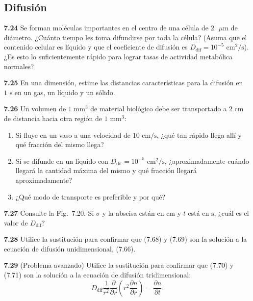 \documentclass[12pt]{book}
\begin{document}
\subsection*{Difusión}

\textbf{7.24} Se forman moléculas importantes en el centro de una célula de $2\text{ }\mu\text{m}$ de diámetro. ¿Cuánto tiempo les toma difundirse por toda la célula? (Asuma que el contenido celular es líquido y que el coeficiente de difusión es $D_{\text{dif}} = 10^{-5}\text{ cm}^2\text{/s}$). ¿Es esto lo suficientemente rápido para lograr tasas de actividad metabólica normales?

\textbf{7.25} En una dimensión, estime las distancias características para la difusión en $1\text{ s}$ en un gas, un líquido y un sólido.

\textbf{7.26} Un volumen de $1\text{ mm}^3$ de material biológico debe ser transportado a $2\text{ cm}$ de distancia hacia otra región de $1\text{ mm}^3$:
\begin{enumerate}
  \item[(a)] Si fluye en un vaso a una velocidad de $10\text{ cm/s}$, ¿qué tan rápido llega allí y qué fracción del mismo llega?
  \item[(b)] Si se difunde en un líquido con $D_{\text{dif}} = 10^{-5}\text{ cm}^2\text{/s}$, ¿aproximadamente cuándo llegará la cantidad máxima del mismo y qué fracción llegará aproximadamente?
  \item[(c)] ¿Qué modo de transporte es preferible y por qué?
\end{enumerate}

\textbf{7.27} Consulte la Fig.~7.20. Si $\sigma$ y la abscisa están en $\text{cm}$ y $t$ está en $\text{s}$, ¿cuál es el valor de $D_{\text{dif}}$?

\textbf{7.28} Utilice la sustitución para confirmar que (7.68) y (7.69) son la solución a la ecuación de difusión unidimensional, (7.66).

\textbf{7.29} (Problema avanzado) Utilice la sustitución para confirmar que (7.70) y (7.71) son la solución a la ecuación de difusión tridimensional:
\begin{equation}
D_{\text{dif}} \frac{1}{r^2} \frac{\partial}{\partial r} \left( r^2 \frac{\partial n}{\partial r} \right) = \frac{\partial n}{\partial t}.
\label{eq:783}
\end{equation}
\end{document}
